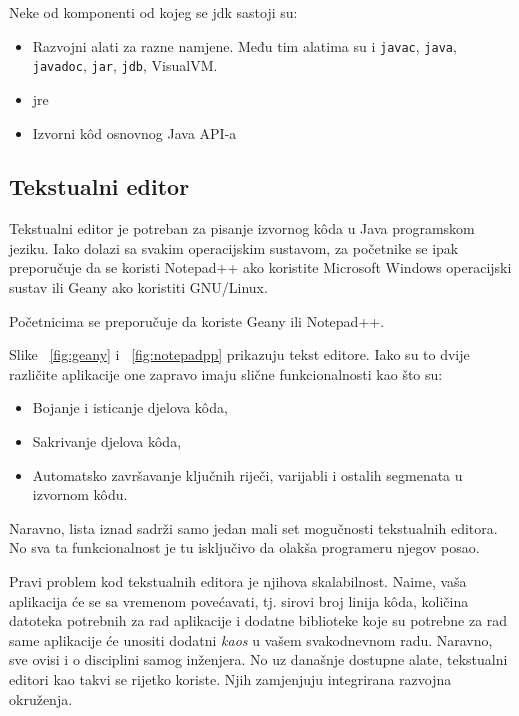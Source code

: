 Neke od komponenti od kojeg se \gls{jdk} sastoji su:

\begin{itemize}
    \item Razvojni alati za razne namjene. Među tim alatima su i \texttt{javac}, \texttt{java}, \texttt{javadoc}, \texttt{jar}, \texttt{jdb}, VisualVM.
    \item \gls{jre}
    \item Izvorni kôd osnovnog Java API-a
\end{itemize}

\subsection{Tekstualni editor}
Tekstualni editor je potreban za pisanje izvornog kôda u Java programskom jeziku. Iako dolazi sa svakim operacijskim sustavom, za početnike se ipak preporučuje da se koristi Notepad++ ako koristite Microsoft Windows operacijski sustav ili Geany ako koristiti GNU/Linux.

\begin{infobox}
    Početnicima se preporučuje da koriste Geany ili Notepad++.
\end{infobox}

Slike ~\ref{fig:geany} i ~\ref{fig:notepadpp} prikazuju tekst editore. Iako su to dvije različite aplikacije one zapravo imaju slične funkcionalnosti kao što su:

\begin{itemize}
    \item Bojanje i isticanje djelova kôda,
    \item Sakrivanje djelova kôda,
    \item Automatsko završavanje ključnih riječi, varijabli i ostalih segmenata u izvornom kôdu.
\end{itemize}

Naravno, lista iznad sadrži samo jedan mali set mogučnosti tekstualnih editora. No sva ta funkcionalnost je tu isključivo da olakša programeru njegov posao.

Pravi problem kod tekstualnih editora je njihova skalabilnost. Naime, vaša aplikacija će se sa vremenom povećavati, tj. sirovi broj linija kôda, količina datoteka potrebnih za rad aplikacije i dodatne biblioteke koje su potrebne za rad same aplikacije će unositi dodatni \emph{kaos} u vašem svakodnevnom radu. Naravno, sve ovisi i o disciplini samog inženjera. No uz današnje dostupne alate, tekstualni editori kao takvi se rijetko koriste. Njih zamjenjuju integrirana razvojna okruženja.

